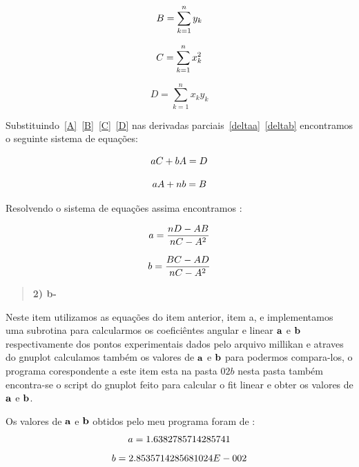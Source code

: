 \documentclass[a4wide]{report}
\begin{document}
\begin{equation}
\centering
B = \sum_{k=1}^{n}{y_{k}}
\label{B}
\end{equation}

\begin{equation}
\centering
C = \sum_{k=1}^{n}{x_{k}^2}
\label{C}
\end{equation}

\begin{equation}
D = \sum_{k=1}^{n}{x_{k}y_{k}}
\label{D}
\end{equation}

Substituindo~\ref{A}~\ref{B}~\ref{C}~\ref{D} nas derivadas parciais~\ref{deltaa}~\ref{deltab} encontramos o seguinte sistema de equações:

\begin{equation}
\centering
aC + bA = D 
\label{sistema1}
\end{equation}

\begin{equation}
\centering
aA + nb = B
\label{sistema1}
\end{equation}

Resolvendo o sistema de equações assima encontramos :

\begin{equation}
\centering
a = \frac{nD - AB}{nC - A^2}
\label{sistema1}
\end{equation}

\begin{equation}
\centering
b = \frac{BC - AD}{nC - A^2}
\label{sistema1}
\end{equation}
 
\begin{quote}

\bf 2) b-

\end{quote}

Neste item utilizamos as equações do item anterior, item a, e implementamos
uma subrotina para calcularmos os coeficiêntes angular e linear ${\bf a}$ e ${\bf b}$ respectivamente 
dos pontos experimentais dados pelo arquivo millikan e atraves do gnuplot calculamos também 
os valores de ${\bf a}$ e ${\bf b}$ para podermos compara-los, o programa corespondente a este 
item esta na pasta $02 b$ nesta pasta também encontra-se o script do gnuplot feito para calcular o fit linear e obter os valores de ${\bf a}$ e ${\bf b}$.

Os valores de ${\bf a}$ e ${\bf b}$ obtidos pelo meu programa foram de :
\begin{equation}
\centering
a =   1.6382785714285741     
\label{CA}
\end{equation}
\begin{equation}
\centering   
b =   2.8535714285681024E-002
\label{CL}
\end{equation}
\end{document}
